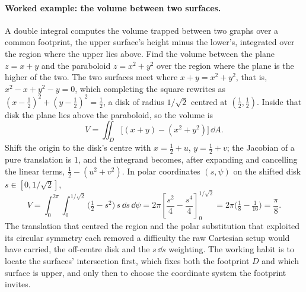 \paragraph{Worked example: the volume between two surfaces.} A double
integral computes the volume trapped between two graphs over a common
footprint, the upper surface's height minus the lower's, integrated
over the region where the upper lies above. Find the volume between
the plane $z = x + y$ and the paraboloid $z = x^{2} + y^{2}$ over the
region where the plane is the higher of the two. The two surfaces meet
where $x + y = x^{2} + y^{2}$, that is, $x^{2} - x + y^{2} - y = 0$,
which completing the square rewrites as $(x - \tfrac{1}{2})^{2} +
(y - \tfrac{1}{2})^{2} = \tfrac{1}{2}$, a disk of radius $1/\sqrt{2}$
centred at $(\tfrac{1}{2}, \tfrac{1}{2})$. Inside that disk the plane
lies above the paraboloid, so the volume is
\[
V = \iint_{D}\big[(x + y) - (x^{2} + y^{2})\big]\,\dd A.
\]
Shift the origin to the disk's centre with $x = \tfrac{1}{2} + u$,
$y = \tfrac{1}{2} + v$; the Jacobian of a pure translation is $1$, and
the integrand becomes, after expanding and cancelling the linear
terms, $\tfrac{1}{2} - (u^{2} + v^{2})$. In polar coordinates
$(s, \psi)$ on the shifted disk $s \in [0, 1/\sqrt{2}]$,
\[
V = \int_{0}^{2\pi}\!\int_{0}^{1/\sqrt{2}}
\Big(\tfrac{1}{2} - s^{2}\Big)\,s\,\dd s\,\dd\psi
= 2\pi\left[\frac{s^{2}}{4} - \frac{s^{4}}{4}\right]_{0}^{1/\sqrt{2}}
= 2\pi\Big(\tfrac{1}{8} - \tfrac{1}{16}\Big) = \frac{\pi}{8}.
\]
The translation that centred the region and the polar substitution
that exploited its circular symmetry each removed a difficulty the
raw Cartesian setup would have carried, the off-centre disk and the
$s\,\dd s$ weighting. The working habit is to locate the
surfaces' intersection first, which fixes both the footprint $D$ and
which surface is upper, and only then to choose the coordinate system
the footprint invites.

